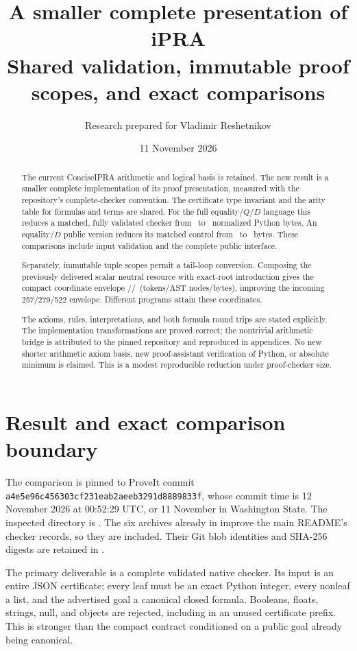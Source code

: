 \documentclass[11pt]{article}
\title{\textbf{A smaller complete presentation of iPRA}\\[4pt]
\large Shared validation, immutable proof scopes, and exact comparisons}
\author{Research prepared for Vladimir Reshetnikov}
\date{11 November 2026}
\theoremstyle{definition}\newtheorem{definition}[theorem]{Definition}
\theoremstyle{remark}\newtheorem{remark}[theorem]{Remark}
\newcommand{\srcsha}{\texttt{a4e5e96c456303cf231eab2aeeb3291d8889833f}}
\begin{document}
\maketitle
\begin{abstract}
The current ConciseIPRA arithmetic and logical basis is retained. The new
result is a smaller complete implementation of its proof presentation,
measured with the repository's complete-checker convention. The certificate
type invariant and the arity table for formulas and terms are shared.
For the full equality/$Q$/$D$ language this reduces a matched, fully
validated checker from \FullOldBytes\ to \FullNewBytes\ normalized Python
bytes. An equality/$D$ public version reduces its matched control from
\EQDoldBytes\ to \EQDnewBytes\ bytes. These comparisons include input
validation and the complete public interface.

Separately, immutable tuple scopes permit a tail-loop conversion.
Composing the previously delivered scalar neutral resource with
exact-root introduction gives the compact coordinate envelope
\CompactNewTokens/\CompactNewAST/\CompactNewBytes\
(tokens/AST nodes/bytes), improving the incoming 257/279/522 envelope.
Different programs attain these coordinates.

The axioms, rules, interpretations, and both formula round trips are stated
explicitly. The implementation transformations are proved correct; the
nontrivial arithmetic bridge is attributed to the pinned repository and
reproduced in appendices. No new shorter arithmetic axiom basis, new
proof-assistant verification of Python, or absolute minimum is claimed.
This is a modest reproducible reduction under proof-checker size.
\end{abstract}
\tableofcontents
\newpage

\section{Result and exact comparison boundary}

The comparison is pinned to ProveIt commit \srcsha, whose commit time is
12 November 2026 at 00:52:29 UTC, or 11 November in Washington State.
The inspected directory is
.
The six archives already in  improve the main
README's checker records, so they are included. Their Git blob identities
and SHA-256 digests are retained in
.

The primary deliverable is a complete validated native checker. Its input
is an entire JSON certificate; every leaf must be an exact Python integer,
every nonleaf a list, and the advertised goal a canonical closed formula.
Booleans, floats, strings, null, and objects are rejected, including in an
unused certificate prefix. This is stronger than the compact contract
conditioned on a public goal already being canonical.
\end{document}
